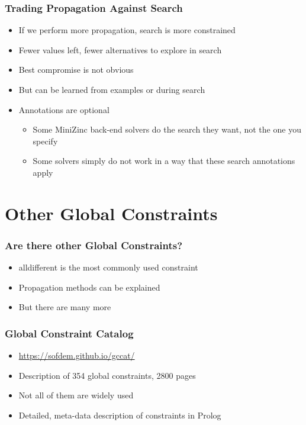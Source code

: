 \begin{frame}
  \frametitle{Trading Propagation Against Search}
  \begin{itemize}
  \item If we perform more propagation, search is more constrained
  \item Fewer values left, fewer alternatives to explore in search
  \item Best compromise is not obvious
  \item But can be learned from examples or during search
  \item Annotations are optional
  \begin{itemize}
  \item Some MiniZinc back-end solvers do the search they want, not the one you specify
  \item Some solvers simply do not work in a way that these search annotations apply
  \end{itemize}
 \end{itemize}
\end{frame}

\section{Other Global Constraints}

\begin{frame}
  \frametitle{Are there other Global Constraints?}
  \begin{itemize}
  \item alldifferent is the most commonly used constraint
  \item Propagation methods can be explained
    \item But there are many more
  \end{itemize}
\end{frame}


\begin{frame}
\frametitle{Global Constraint Catalog}
\begin{itemize}
\item \url{https://sofdem.github.io/gccat/}
\item Description of 354 global constraints, 2800 pages
\item Not all of them are widely used
\item Detailed, meta-data description of constraints in Prolog
\end{itemize}
\end{frame}

